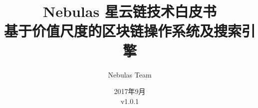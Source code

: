 \documentclass[11.5pt]{article}
\begin{document}
\renewcommand{\contentsname}{目录}
\renewcommand{\abstractname}{摘要}
\renewcommand{\refname}{参考文献}
\renewcommand{\nomname}{术语表（按首字母排序）}
\renewcommand{\figurename}{图}
\renewcommand{\tablename}{表}
\renewcommand{\baselinestretch}{1.5}
\renewcommand{\appendixname}{附录}

\title{
	Nebulas 星云链技术白皮书 \\
	\large 基于价值尺度的区块链操作系统及搜索引擎}
\author{Nebulas Team}
\date{2017年9月\\v1.0.1}

\maketitle

\newpage

\tableofcontents

\printnomenclature


\newpage

\newpage

\newpage

\newpage

\newpage

\newpage

\newpage

\newpage

\newpage

\printbibliography

\begin{appendices}



\end{appendices}

%
\end{document}
